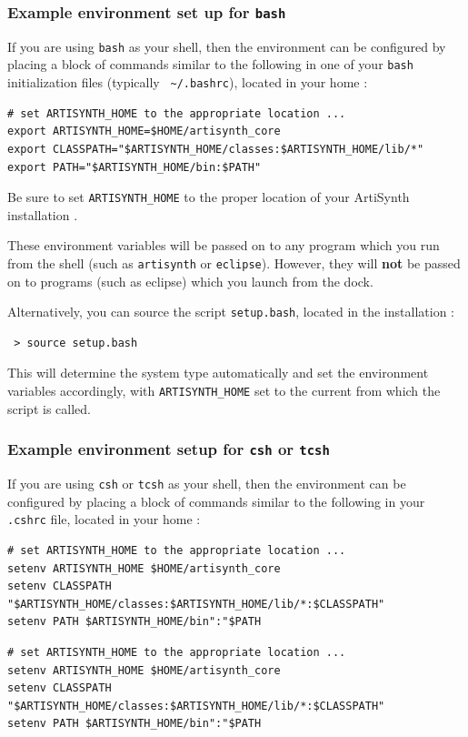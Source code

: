 \ifWindows\else %
\subsubsection{Example environment set up for {\tt bash}}
\label{BashEnvironmentSetup}

If you are using {\tt bash} as your shell, then the environment can be
configured by placing a block of commands similar to the following in
one of your {\tt bash} initialization files (typically {\tt
\textasciitilde/.bashrc}), located in your home \directory{}:

\begin{lstlisting}[]
# set ARTISYNTH_HOME to the appropriate location ...
export ARTISYNTH_HOME=$HOME/artisynth_core
export CLASSPATH="$ARTISYNTH_HOME/classes:$ARTISYNTH_HOME/lib/*"
export PATH="$ARTISYNTH_HOME/bin:$PATH"
\end{lstlisting}

Be sure to set {\tt ARTISYNTH\_HOME} to the proper location of your
ArtiSynth installation \directory{}.

These environment variables will be passed on to any program which you
run from the shell (such as {\tt artisynth} or {\tt eclipse}).
\ifMacOS
However, they will {\bf not} be passed on to programs (such as eclipse)
which you launch from the dock.
\fi

Alternatively, you can source the script {\tt setup.bash}, located in
the installation \directory{}:

\begin{verbatim}
 > source setup.bash
\end{verbatim}

This will determine the system type automatically and set the
environment variables accordingly, with {\tt ARTISYNTH\_HOME} set to the
current \directory{} from which the script is called.

\subsubsection{Example environment setup for {\tt csh} or {\tt tcsh}}
\label{CshEnvironmentSetup}

If you are using {\tt csh} or {\tt tcsh} as your shell, then the
environment can be configured by placing a block of commands similar
to the following in your {\tt .cshrc} file, located in your home
\directory{}:

\ifLinux
\begin{lstlisting}[]
# set ARTISYNTH_HOME to the appropriate location ...
setenv ARTISYNTH_HOME $HOME/artisynth_core
setenv CLASSPATH "$ARTISYNTH_HOME/classes:$ARTISYNTH_HOME/lib/*:$CLASSPATH"
setenv PATH $ARTISYNTH_HOME/bin":"$PATH
\end{lstlisting}
\else\ifMacOS
\begin{lstlisting}[]
# set ARTISYNTH_HOME to the appropriate location ...
setenv ARTISYNTH_HOME $HOME/artisynth_core
setenv CLASSPATH "$ARTISYNTH_HOME/classes:$ARTISYNTH_HOME/lib/*:$CLASSPATH"
setenv PATH $ARTISYNTH_HOME/bin":"$PATH
\end{lstlisting}
\fi %
\fi %

